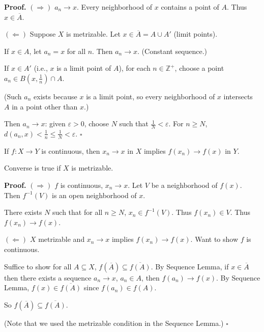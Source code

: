 \documentclass[11pt]{report}
\renewenvironment{proof}[1][Proof]{\noindent\textbf{#1.} }{\hfill$\square$\par\vspace{5pt}}
\begin{document}
\begin{proof}
$(\Rightarrow)$ $a_n \to x$. Every neighborhood of $x$ contains a point of $A$. Thus $x \in \overline{A}$.

$(\Leftarrow)$ Suppose $X$ is metrizable. Let $x \in \overline{A} = A \cup A'$ (limit points).

If $x \in A$, let $a_n = x$ for all $n$. Then $a_n \to x$. (Constant sequence.)

If $x \in A'$ (i.e., $x$ is a limit point of $A$), for each $n \in \mathbb{Z}^+$, choose a point $a_n \in B(x, \frac{1}{n}) \cap A$.

(Such $a_n$ exists because $x$ is a limit point, so every neighborhood of $x$ intersects $A$ in a point other than $x$.)

Then $a_n \to x$: given $\varepsilon > 0$, choose $N$ such that $\frac{1}{N} < \varepsilon$. For $n \geq N$, $d(a_n, x) < \frac{1}{n} \leq \frac{1}{N} < \varepsilon$.
\end{proof}

\begin{thmbox}
If $f: X \to Y$ is continuous, then $x_n \to x$ in $X$ implies $f(x_n) \to f(x)$ in $Y$.

Converse is true if $X$ is metrizable.
\end{thmbox}

\begin{proof}
$(\Rightarrow)$ $f$ is continuous, $x_n \to x$. Let $V$ be a neighborhood of $f(x)$. Then $f^{-1}(V)$ is an open neighborhood of $x$.

There exists $N$ such that for all $n \geq N$, $x_n \in f^{-1}(V)$. Thus $f(x_n) \in V$. Thus $f(x_n) \to f(x)$.

$(\Leftarrow)$ $X$ metrizable and $x_n \to x$ implies $f(x_n) \to f(x)$. Want to show $f$ is continuous.

Suffice to show for all $A \subseteq X$, $f(\overline{A}) \subseteq \overline{f(A)}$. By Sequence Lemma, if $x \in \overline{A}$ then there exists a sequence $a_n \to x$, $a_n \in A$, then $f(a_n) \to f(x)$. By Sequence Lemma, $f(x) \in \overline{f(A)}$ since $f(a_n) \in f(A)$.

So $f(\overline{A}) \subseteq \overline{f(A)}$.

(Note that we used the metrizable condition in the Sequence Lemma.)
\end{proof}

\end{document}
